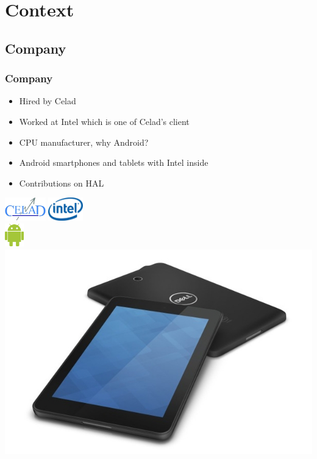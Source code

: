 %
%

\section{Context}

\subsection{Company}
\begin{frame}
    \frametitle{Company}
    \begin{minipage}{0.49\textwidth}
        \begin{itemize}
            \item Hired by Celad
            \item Worked at Intel which is one of Celad's client
            \item CPU manufacturer, why Android?
            \item Android smartphones and tablets with Intel inside
            \item Contributions on HAL
        \end{itemize}
    \end{minipage}
    \begin{minipage}{0.49\textwidth}
        \flushright
        \includegraphics[height=1cm]{../../report/src/img/logocelad.jpg} \hspace{0.2cm}
        \includegraphics[height=1cm]{../../report/src/img/logointel.jpg} \\[0.5cm]
        \includegraphics[height=1cm]{./img/androidLogo.png} \\
        \includegraphics[height=0.4\textheight]{./img/dell-venue.jpg}
    \end{minipage}
\end{frame}

